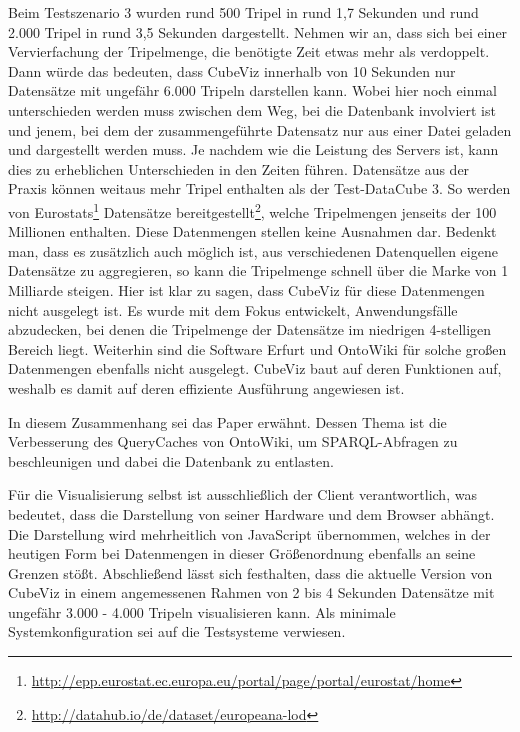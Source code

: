 \documentclass[11pt]{article}
\newcommand{\com}[1]{\marginpar{\em {\small{#1}}}} %
\begin{document}
Beim Testszenario 3 wurden rund 500 Tripel in rund 1,7 Sekunden und rund 2.000 Tripel in rund 3,5 Sekunden dargestellt. Nehmen wir an, dass sich bei einer Vervierfachung der Tripelmenge, die benötigte Zeit etwas mehr als verdoppelt. Dann würde das bedeuten, dass CubeViz innerhalb von 10 Sekunden nur Datensätze mit ungefähr 6.000 Tripeln darstellen kann. Wobei hier noch einmal unterschieden werden muss zwischen dem Weg, bei die Datenbank involviert ist und jenem, bei dem der zusammengeführte Datensatz nur aus einer Datei geladen und dargestellt werden muss. Je nachdem wie die Leistung des Servers ist, kann dies zu erheblichen Unterschieden in den Zeiten führen. Datensätze aus der Praxis können weitaus mehr Tripel enthalten als der Test-DataCube 3. So werden von Eurostats\footnote{\url{http://epp.eurostat.ec.europa.eu/portal/page/portal/eurostat/home}} Datensätze bereitgestellt\footnote{\url{http://datahub.io/de/dataset/europeana-lod}}, welche Tripelmengen jenseits der 100 Millionen enthalten. Diese Datenmengen stellen keine Ausnahmen dar. Bedenkt man, dass es zusätzlich auch möglich ist, aus verschiedenen Datenquellen eigene Datensätze zu aggregieren, so kann die Tripelmenge schnell über die Marke von 1 Milliarde steigen. Hier ist klar zu sagen, dass CubeViz für diese Datenmengen nicht ausgelegt ist. \com{Performance-Grenzen} Es wurde mit dem Fokus entwickelt, Anwendungsfälle abzudecken, bei denen die Tripelmenge der Datensätze im niedrigen 4-stelligen Bereich liegt. Weiterhin sind die Software Erfurt und OntoWiki für solche großen Datenmengen ebenfalls nicht ausgelegt. CubeViz baut auf deren Funktionen auf, weshalb es damit auf deren effiziente Ausführung angewiesen ist. 

In diesem Zusammenhang sei das Paper \cite{SPARQL-QUERYCACHE} erwähnt. Dessen Thema ist die Verbesserung des \mbox{QueryCaches} von \mbox{OntoWiki}, um SPARQL-Abfragen zu beschleunigen und dabei die Datenbank zu entlasten. 

Für die Visualisierung selbst ist ausschließlich der Client verantwortlich, was bedeutet, dass die Darstellung von seiner Hardware und dem Browser abhängt. Die Darstellung wird mehrheitlich von JavaScript übernommen, welches in der heutigen Form bei Datenmengen in dieser Größenordnung ebenfalls an seine Grenzen stößt. Abschließend lässt sich festhalten, dass die aktuelle Version von CubeViz in einem angemessenen Rahmen von 2 bis 4 Sekunden Datensätze mit ungefähr 3.000 - 4.000 Tripeln visualisieren kann. Als minimale Systemkonfiguration sei auf die Testsysteme verwiesen.
\end{document}
